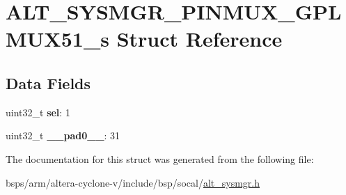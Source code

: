 \hypertarget{structALT__SYSMGR__PINMUX__GPLMUX51__s}{}\section{A\+L\+T\+\_\+\+S\+Y\+S\+M\+G\+R\+\_\+\+P\+I\+N\+M\+U\+X\+\_\+\+G\+P\+L\+M\+U\+X51\+\_\+s Struct Reference}
\label{structALT__SYSMGR__PINMUX__GPLMUX51__s}
\subsection*{Data Fields}
\begin{DoxyCompactItemize}
\item 
\mbox{\label{structALT__SYSMGR__PINMUX__GPLMUX51__s_a30065fcc040a3d2b4712babb4c6c4aef}} 
uint32\+\_\+t {\bfseries sel}\+: 1
\item 
\mbox{\label{structALT__SYSMGR__PINMUX__GPLMUX51__s_adf9b1c497538864f9994b278db925f8d}} 
uint32\+\_\+t {\bfseries \+\_\+\+\_\+pad0\+\_\+\+\_\+}\+: 31
\end{DoxyCompactItemize}


The documentation for this struct was generated from the following file\+:\begin{DoxyCompactItemize}
\item 
bsps/arm/altera-\/cyclone-\/v/include/bsp/socal/\mbox{\hyperlink{alt__sysmgr_8h}{alt\+\_\+sysmgr.\+h}}\end{DoxyCompactItemize}

